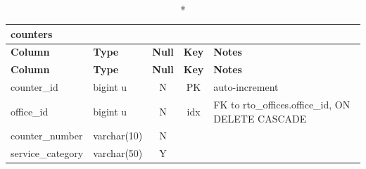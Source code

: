 \vspace{-0.4em}
\begin{longtable}{@{}p{3.4cm}p{2.9cm}c c p{5.6cm}@{}}
\caption*{\textbf{counters}}\\
\toprule \textbf{Column} & \textbf{Type} & \textbf{Null} & \textbf{Key} & \textbf{Notes} \\ \midrule \endfirsthead
\toprule \textbf{Column} & \textbf{Type} & \textbf{Null} & \textbf{Key} & \textbf{Notes} \\ \midrule \endhead
\bottomrule \endlastfoot
counter\_\allowbreak{}id & bigint u & N & PK & auto-increment \\
office\_\allowbreak{}id & bigint u & N & idx & FK to rto\_\allowbreak{}offices.office\_\allowbreak{}id, ON DELETE CASCADE \\
counter\_\allowbreak{}number & varchar(10) & N &  &  \\
service\_\allowbreak{}category & varchar(50) & Y &  &  \\
\end{longtable}
\vspace{-0.4em}
